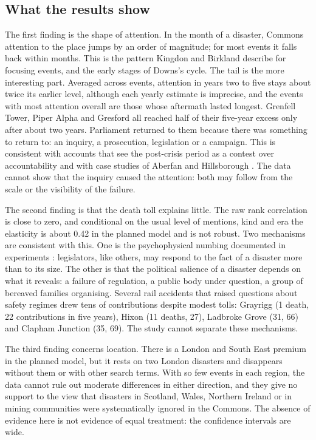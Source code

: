 \documentclass[11pt,a4paper]{article}
\begin{document}
\subsection{What the results show}
The first finding is the shape of attention. In the month of a disaster, Commons attention to the place jumps by an order of magnitude; for most events it falls back within months. This is the pattern Kingdon and Birkland describe for focusing events, and the early stages of Downs's cycle. The tail is the more interesting part. Averaged across events, attention in years two to five stays about twice its earlier level, although each yearly estimate is imprecise, and the events with most attention overall are those whose aftermath lasted longest. Grenfell Tower, Piper Alpha and Gresford all reached half of their five-year excess only after about two years. Parliament returned to them because there was something to return to: an inquiry, a prosecution, legislation or a campaign. This is consistent with accounts that see the post-crisis period as a contest over accountability \citep{Boin2009,Hood2011} and with case studies of Aberfan and Hillsborough \citep{McLeanJohnes2000,Scraton1999}. The data cannot show that the inquiry caused the attention: both may follow from the scale or the visibility of the failure.

The second finding is that the death toll explains little. The raw rank correlation is close to zero, and conditional on the usual level of mentions, kind and era the elasticity is about 0.42 in the planned model and is not robust. Two mechanisms are consistent with this. One is the psychophysical numbing documented in experiments \citep{Fetherstonhaugh1997,Slovic2007}: legislators, like others, may respond to the fact of a disaster more than to its size. The other is that the political salience of a disaster depends on what it reveals: a failure of regulation, a public body under question, a group of bereaved families organising. Several rail accidents that raised questions about safety regimes drew tens of contributions despite modest tolls: Grayrigg (1 death, 22 contributions in five years), Hixon (11 deaths, 27), Ladbroke Grove (31, 66) and Clapham Junction (35, 69). The study cannot separate these mechanisms.

The third finding concerns location. There is a London and South East premium in the planned model, but it rests on two London disasters and disappears without them or with other search terms. With so few events in each region, the data cannot rule out moderate differences in either direction, and they give no support to the view that disasters in Scotland, Wales, Northern Ireland or in mining communities were systematically ignored in the Commons. The absence of evidence here is not evidence of equal treatment: the confidence intervals are wide.
\end{document}
